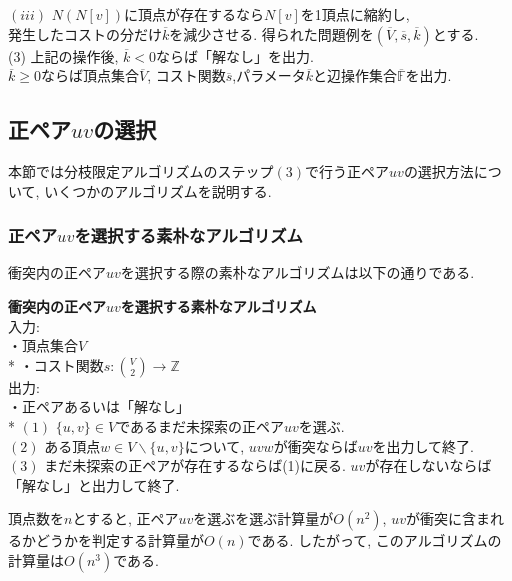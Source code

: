 \documentclass[10.5,a4paper,titlepage, dvipdfmx]{bxjsarticle}
\begin{document}
\begin{screen}
    \hspace{15pt}$(iii)$ $N(N[v])$に頂点が存在するなら$N[v]$を1頂点に縮約し,\\
    \hspace{15pt} \hspace{15pt} 発生したコストの分だけ$\overline{k}$を減少させる. 得られた問題例を$(\overline{V},\overline{s},\overline{k})$とする.\\
    (3) 上記の操作後, $\overline{k} < 0$ならば「解なし」を出力.\\
    \hspace{15pt} $\overline{k} \ge 0$ならば頂点集合$\overline{V}$, コスト関数$\overline{s}$,パラメータ$\overline{k}$と辺操作集合$\overline{\mathbb{F}}$を出力.
\end{screen}


\subsection{正ペア$uv$の選択}
本節では分枝限定アルゴリズムのステップ$(3)$で行う正ペア$uv$の選択方法について, いくつかのアルゴリズムを説明する.

\subsubsection{正ペア$uv$を選択する素朴なアルゴリズム}
衝突内の正ペア$uv$を選択する際の素朴なアルゴリズムは以下の通りである.

\begin{screen}
    \textbf{衝突内の正ペア$uv$を選択する素朴なアルゴリズム}\\
    入力: \\
    \hspace{15pt} ・頂点集合$V$ \\*
    \hspace{15pt} ・コスト関数$s:\binom{V}{2} \rightarrow \mathbb{Z}$ \\
    出力: \\
    \hspace{15pt} ・正ペアあるいは「解なし」\\*
    $(1)$ $\{u,v\} \in V$であるまだ未探索の正ペア$uv$を選ぶ.\\
    $(2)$ ある頂点$w \in V \backslash \{u,v\}$について, $uvw$が衝突ならば$uv$を出力して終了.\\
    $(3)$ まだ未探索の正ペアが存在するならば(1)に戻る. $uv$が存在しないならば「解なし」と出力して終了.
\end{screen}

頂点数を$n$とすると, 正ペア$uv$を選ぶを選ぶ計算量が$O(n^2)$, $uv$が衝突に含まれるかどうかを判定する計算量が$O(n)$である.
したがって, このアルゴリズムの計算量は$O(n^3)$である.
\end{document}
